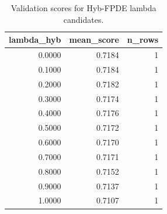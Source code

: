 \begin{table}[t]
\caption{Validation scores for Hyb-FPDE lambda candidates.}
\label{tab:lambda_distribution_computed}
\centering
\begin{tabular}{rrr}
\toprule
lambda\_hyb & mean\_score & n\_rows \\
\midrule
0.0000 & 0.7184 & 1 \\
0.1000 & 0.7184 & 1 \\
0.2000 & 0.7182 & 1 \\
0.3000 & 0.7174 & 1 \\
0.4000 & 0.7176 & 1 \\
0.5000 & 0.7172 & 1 \\
0.6000 & 0.7170 & 1 \\
0.7000 & 0.7171 & 1 \\
0.8000 & 0.7152 & 1 \\
0.9000 & 0.7137 & 1 \\
1.0000 & 0.7107 & 1 \\
\bottomrule
\end{tabular}

\end{table}
